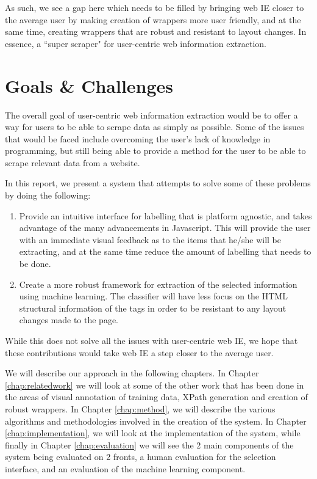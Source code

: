 As such, we see a gap here which needs to be filled by bringing web IE closer to the average
user by making creation of wrappers more user friendly, and at the same time, creating wrappers
that are robust and resistant to layout changes. In essence, a ``super scraper" for
user-centric web information extraction.

\section{Goals \& Challenges}
The overall goal of user-centric web information extraction would be to offer a way for users
to be able to scrape data as simply as possible. Some of the issues that would be faced include
overcoming the user's lack of knowledge in programming, but still being able to provide a method
for the user to be able to scrape relevant data from a website.

In this report, we present a system that attempts to solve some of these problems by doing the
following:
	\begin{enumerate}
		\item Provide an intuitive interface for labelling that is platform agnostic, and takes
		 advantage of the many advancements in Javascript. This will provide the user with an
		 immediate visual feedback as to the items that he/she will be extracting, and at the
		 same time reduce the amount of labelling that needs to be done.
		\item Create a more robust framework for extraction of the selected information using
		machine learning. The classifier will have less focus on the HTML structural
		information of the tags in order to be resistant to any layout changes made to the page.
	\end{enumerate}

While this does not solve all the issues with user-centric web IE, we hope that these contributions
would take web IE a step closer to the average user.

We will describe our approach in the following chapters. In Chapter \ref{chap:relatedwork} we
will look at some of the other work that has been done in the areas of visual annotation of
training data, XPath generation and creation of robust wrappers. In Chapter \ref{chap:method},
we will describe the various algorithms and methodologies involved in the creation of the
system. In Chapter \ref{chap:implementation}, we will look at the implementation of the system,
while finally in Chapter \ref{chap:evaluation} we will see the 2 main components of the system
being evaluated on 2 fronts, a human evaluation for the selection interface, and an evaluation
of the machine learning component.

